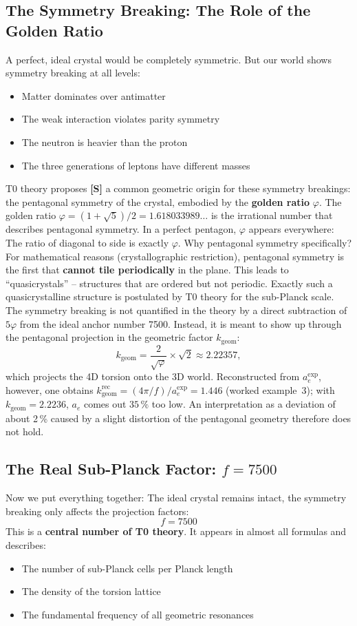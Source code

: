 	\subsection{The Symmetry Breaking: The Role of the Golden Ratio}
	A perfect, ideal crystal would be completely symmetric. But our world shows symmetry breaking at all levels:
	\begin{itemize}
		\item Matter dominates over antimatter
		\item The weak interaction violates parity symmetry
		\item The neutron is heavier than the proton
		\item The three generations of leptons have different masses
	\end{itemize}
	T0 theory proposes \textbf{[S]} a common geometric origin for these symmetry breakings: the pentagonal symmetry of the crystal, embodied by the \textbf{golden ratio} \(\varphi\).
	The golden ratio \(\varphi = (1+\sqrt{5})/2 = 1.618033989\ldots\) is the irrational number that describes pentagonal symmetry. In a perfect pentagon, \(\varphi\) appears everywhere: The ratio of diagonal to side is exactly \(\varphi\).
	Why pentagonal symmetry specifically? For mathematical reasons (crystallographic restriction), pentagonal symmetry is the first that \textbf{cannot tile periodically} in the plane. This leads to \enquote{quasicrystals} -- structures that are ordered but not periodic. Exactly such a quasicrystalline structure is postulated by T0 theory for the sub-Planck scale.
	The symmetry breaking is not quantified in the theory by a direct subtraction of \(5\varphi\) from the ideal anchor number 7500. Instead, it is meant to show up through the pentagonal projection in the geometric factor \(k_\text{geom}\):
	\begin{equation}
		k_\text{geom} = \frac{2}{\sqrt{\varphi}} \times \sqrt{2} \approx 2.22357,
	\end{equation}
	which projects the 4D torsion onto the 3D world. Reconstructed from $a_e^{\exp}$, however, one obtains $k_\text{geom}^\text{rec} = (4\pi/f)/a_e^{\exp} = 1.446$ (worked example~3); with $k_\text{geom} = 2.2236$, $a_e$ comes out $35\,\%$ too low. An interpretation as a deviation of about 2\,\% caused by a slight distortion of the pentagonal geometry therefore does not hold.
	\subsection{The Real Sub-Planck Factor: \(f = 7500\)}
	Now we put everything together: The ideal crystal remains intact, the symmetry breaking only affects the projection factors:
	\begin{equation}
		\boxed{f = 7500}
	\end{equation}
	This is a \textbf{central number of T0 theory}. It appears in almost all formulas and describes:
	\begin{itemize}
		\item The number of sub-Planck cells per Planck length
		\item The density of the torsion lattice
		\item The fundamental frequency of all geometric resonances
	\end{itemize}
